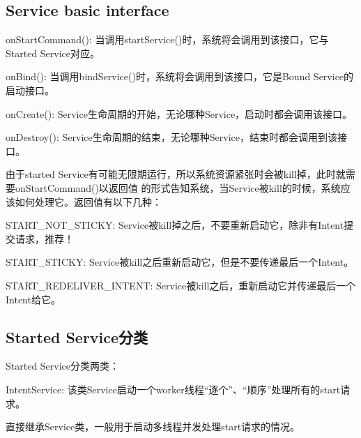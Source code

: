 ﻿\documentclass[a4paper,11pt]{article}
\begin{document}
  \subsection[Service basic interface]{Service basic interface}
  \begin{coloredenumerate}
    \item onStartCommand(): 当调用startService()时，系统将会调用到该接口，它与Started Service对应。
    \item onBind(): 当调用bindService()时，系统将会调用到该接口，它是Bound Service的启动接口。
    \item onCreate(): Service生命周期的开始，无论哪种Service，启动时都会调用该接口。
    \item onDestroy(): Service生命周期的结束，无论哪种Service，结束时都会调用到该接口。
  \end{coloredenumerate}
  
  由于started Service有可能无限期运行，所以系统资源紧张时会被kill掉，此时就需要onStartCommand()以返回值
  的形式告知系统，当Service被kill的时候，系统应该如何处理它。返回值有以下几种：\par
  \begin{coloredenumerate}
    \item START\_NOT\_STICKY: Service被kill掉之后，不要重新启动它，除非有Intent提交请求，推荐！
    \item START\_STICKY: Service被kill之后重新启动它，但是不要传递最后一个Intent。
    \item START\_REDELIVER\_INTENT: Service被kill之后，重新启动它并传递最后一个Intent给它。
  \end{coloredenumerate}
  
  \subsection[Started Service分类]{Started Service分类}
  Started Service分类两类：\par
  \begin{coloredenumerate}
    \item IntentService: 该类Service启动一个worker线程“逐个”、“顺序”处理所有的start请求。
    \item 直接继承Service类，一般用于启动多线程并发处理start请求的情况。
  \end{coloredenumerate}
  
\end{document}
